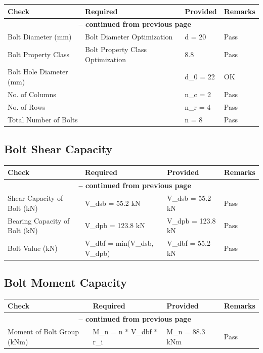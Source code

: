 \documentclass[12pt]{article}
\begin{document}
\begin{longtable}{llll}
\cellcolor{OsdagGreen} Check & \cellcolor{OsdagGreen} Required & \cellcolor{OsdagGreen} Provided & \cellcolor{OsdagGreen} Remarks \\ \hline
\endfirsthead
\multicolumn{4}{c}{{\bfseries \tablename\ \thetable{} -- continued from previous page}} \\
\endhead
\endfoot
\endlastfoot
Bolt Diameter (mm) & Bolt Diameter Optimization & d = 20 & Pass \\
\hline
Bolt Property Class & Bolt Property Class Optimization & 8.8 & Pass \\
\hline
Bolt Hole Diameter (mm) &   & d\_0 = 22 & OK \\
\hline
No. of Columns &  & n\_c = 2 & Pass \\
\hline
No. of Rows &  & n\_r = 4 & Pass \\
\hline
Total Number of Bolts &  & n = 8 & Pass \\
\hline
\end{longtable}

\subsection{Bolt Shear Capacity}

\begin{longtable}{llll}
\cellcolor{OsdagGreen} Check & \cellcolor{OsdagGreen} Required & \cellcolor{OsdagGreen} Provided & \cellcolor{OsdagGreen} Remarks \\ \hline
\endfirsthead
\multicolumn{4}{c}{{\bfseries \tablename\ \thetable{} -- continued from previous page}} \\
\endhead
\endfoot
\endlastfoot
Shear Capacity of Bolt (kN) & V\_dsb = 55.2 kN & V\_dsb = 55.2 kN & Pass \\
\hline
Bearing Capacity of Bolt (kN) & V\_dpb = 123.8 kN & V\_dpb = 123.8 kN & Pass \\
\hline
Bolt Value (kN) & V\_dbf = min(V\_dsb, V\_dpb) & V\_dbf = 55.2 kN & Pass \\
\hline
\end{longtable}

\subsection{Bolt Moment Capacity}

\begin{longtable}{llll}
\cellcolor{OsdagGreen} Check & \cellcolor{OsdagGreen} Required & \cellcolor{OsdagGreen} Provided & \cellcolor{OsdagGreen} Remarks \\ \hline
\endfirsthead
\multicolumn{4}{c}{{\bfseries \tablename\ \thetable{} -- continued from previous page}} \\
\endhead
\endfoot
\endlastfoot
Moment of Bolt Group (kNm) & M\_n = n * V\_dbf * r\_i & M\_n = 88.3 kNm & Pass \\
\hline
\end{longtable}
\end{document}
